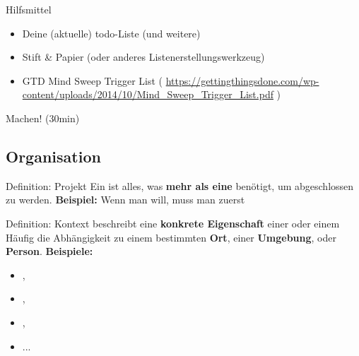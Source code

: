 \begin{frame}[c]{Hilfsmittel}
    \Large
    \begin{itemize}[<+(1)->]
        \item Deine (aktuelle) todo-Liste (und weitere)
        \item Stift \& Papier (oder anderes Listenerstellungswerkzeug)
        \item GTD Mind Sweep Trigger List \cite{trigger-list} ( \url{https://gettingthingsdone.com/wp-content/uploads/2014/10/Mind_Sweep_Trigger_List.pdf} )
    \end{itemize}
\end{frame}


\begin{frame}[standout]
    Machen! (30min)
\end{frame}

\subsection{Organisation}

\begin{frame}[c]{Definition: Projekt}
    Ein  ist alles, was \textbf{mehr als eine}  benötigt, um abgeschlossen zu werden. \newline \newline \pause
    \textbf{Beispiel:} Wenn man 
    will, muss man zuerst 
\end{frame}


\begin{frame}[c]{Definition: Kontext}
     beschreibt eine \textbf{konkrete Eigenschaft} einer
     oder einem  Häufig die Abhängigkeit zu einem
    bestimmten \textbf{Ort}, einer \textbf{Umgebung}, oder \textbf{Person}.
    \newline \newline \pause
    \textbf{Beispiele:}
    \begin{itemize}[<+(1)->]
        \item {}, 
        \item {}, 
        \item {}, 
        \item ...
    \end{itemize}
\end{frame}


